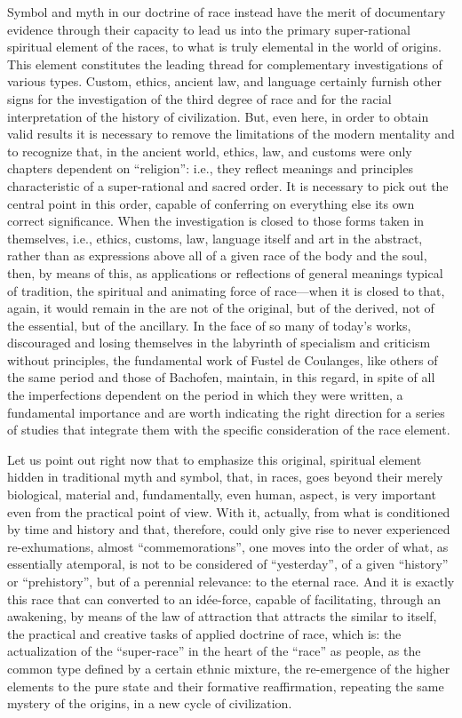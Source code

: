 Symbol and myth in our doctrine of race instead have the merit of documentary evidence through their capacity to lead us into the primary super-rational spiritual element of the races, to what is truly elemental in the world of origins. This element constitutes the leading thread for complementary investigations of various types. Custom, ethics, ancient law, and language certainly furnish other signs for the investigation of the third degree of race and for the racial interpretation of the history of civilization. But, even here, in order to obtain valid results it is necessary to remove the limitations of the modern mentality and to recognize that, in the ancient world, ethics, law, and customs were only chapters dependent on ``religion'': i.e., they reflect meanings and principles characteristic of a super-rational and sacred order. It is necessary to pick out the central point in this order, capable of conferring on everything else its own correct significance. When the investigation is closed to those forms taken in themselves, i.e., ethics, customs, law, language itself and art in the abstract, rather than as expressions above all of a given race of the body and the soul, then, by means of this, as applications or reflections of general meanings typical of tradition, the spiritual and animating force of race---when it is closed to that, again, it would remain in the are not of the original, but of the derived, not of the essential, but of the ancillary. In the face of so many of today's works, discouraged and losing themselves in the labyrinth of specialism and criticism without principles, the fundamental work of Fustel de Coulanges, like others of the same period and those of Bachofen, maintain, in this regard, in spite of all the imperfections dependent on the period in which they were written, a fundamental importance and are worth indicating the right direction for a series of studies that integrate them with the specific consideration of the race element.

Let us point out right now that to emphasize this original, spiritual element hidden in traditional myth and symbol, that, in races, goes beyond their merely biological, material and, fundamentally, even human, aspect, is very important even from the practical point of view. With it, actually, from what is conditioned by time and history and that, therefore, could only give rise to never experienced re-exhumations, almost ``commemorations'', one moves into the order of what, as essentially atemporal, is not to be considered of ``yesterday'', of a given ``history'' or ``prehistory'', but of a perennial relevance: to the eternal race. And it is exactly this race that can converted to an idée-force, capable of facilitating, through an awakening, by means of the law of attraction that attracts the similar to itself, the practical and creative tasks of applied doctrine of race, which is: the actualization of the ``super-race'' in the heart of the ``race'' as people, as the common type defined by a certain ethnic mixture, the re-emergence of the higher elements to the pure state and their formative reaffirmation, repeating the same mystery of the origins, in a new cycle of civilization.


